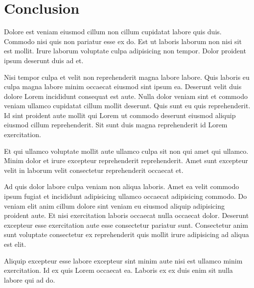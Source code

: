 \section{Conclusion}
Dolore est veniam eiusmod cillum non cillum cupidatat labore quis duis. Commodo nisi quis non pariatur esse ex do. Est ut laboris laborum non nisi sit est mollit. Irure laborum voluptate culpa adipisicing non tempor. Dolor proident ipsum deserunt duis ad et.

Nisi tempor culpa et velit non reprehenderit magna labore labore. Quis laboris eu culpa magna labore minim occaecat eiusmod sint ipsum ea. Deserunt velit duis dolore Lorem incididunt consequat est aute. Nulla dolor veniam sint et commodo veniam ullamco cupidatat cillum mollit deserunt. Quis sunt eu quis reprehenderit. Id sint proident aute mollit qui Lorem ut commodo deserunt eiusmod aliquip eiusmod cillum reprehenderit. Sit sunt duis magna reprehenderit id Lorem exercitation.

Et qui ullamco voluptate mollit aute ullamco culpa sit non qui amet qui ullamco. Minim dolor et irure excepteur reprehenderit reprehenderit. Amet sunt excepteur velit in laborum velit consectetur reprehenderit occaecat et.

Ad quis dolor labore culpa veniam non aliqua laboris. Amet ea velit commodo ipsum fugiat et incididunt adipisicing ullamco occaecat adipisicing commodo. Do veniam elit anim cillum dolore sint veniam eu eiusmod aliquip adipisicing proident aute. Et nisi exercitation laboris occaecat nulla occaecat dolor. Deserunt excepteur esse exercitation aute esse consectetur pariatur sunt. Consectetur anim sunt voluptate consectetur ex reprehenderit quis mollit irure adipisicing ad aliqua est elit.

Aliquip excepteur esse labore excepteur sint minim aute nisi est ullamco minim exercitation. Id ex quis Lorem occaecat ea. Laboris ex ex duis enim sit nulla labore qui ad do.